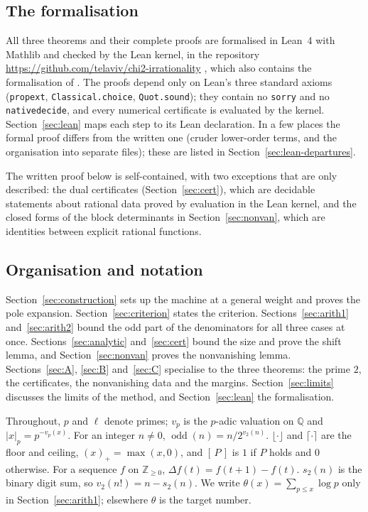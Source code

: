 \documentclass[11pt]{amsart}
\theoremstyle{definition}
\theoremstyle{remark}
\numberwithin{equation}{section}
\newcommand{\ZZ}{\mathbb{Z}}
\newcommand{\QQ}{\mathbb{Q}}
\newcommand{\ind}[1]{[\,#1\,]}
\newcommand{\odd}{\operatorname{odd}}
\newcommand{\lean}[1]{{\def\_{\textunderscore\allowbreak}\texttt{#1}}}
\begin{document}
\subsection{The formalisation}
All three theorems and their complete proofs are formalised in Lean~4 \cite{LeanFour} with Mathlib \cite{Mathlib} and
checked by the Lean kernel, in the repository \url{https://github.com/telaviv/chi2-irrationality} \cite{Chi2Repo},
which also contains the formalisation of \cite{Chi2Paper}. The proofs depend only on Lean's three standard axioms
(\lean{propext}, \lean{Classical.choice}, \lean{Quot.sound}); they contain no \lean{sorry} and no
\lean{native\_decide}, and every numerical certificate is evaluated by the kernel. Section~\ref{sec:lean} maps each
step to its Lean declaration. In a few places the formal proof differs from the written one (cruder lower-order terms,
and the organisation into separate files); these are listed in
Section~\ref{sec:lean-departures}.

The written proof below is self-contained, with two exceptions that are only described: the dual certificates
(Section~\ref{sec:cert}), which are decidable statements about rational data proved by evaluation in the Lean kernel,
and the closed forms of the block determinants in Section~\ref{sec:nonvan}, which are identities between explicit
rational functions.

\subsection{Organisation and notation}
Section~\ref{sec:construction} sets up the machine at a general weight and proves the pole expansion.
Section~\ref{sec:criterion} states the criterion. Sections~\ref{sec:arith1} and~\ref{sec:arith2} bound the odd part of the
denominators for all three cases at once. Sections~\ref{sec:analytic} and~\ref{sec:cert} bound the size and prove the shift
lemma, and Section~\ref{sec:nonvan} proves the nonvanishing lemma. Sections~\ref{sec:A}, \ref{sec:B} and~\ref{sec:C}
specialise to the three theorems: the prime $2$, the certificates, the nonvanishing data and the margins.
Section~\ref{sec:limits} discusses the limits of the method, and Section~\ref{sec:lean} the formalisation.

Throughout, $p$ and $\ell$ denote primes; $v_p$ is the $p$-adic valuation on $\QQ$ and $|x|_p=p^{-v_p(x)}$. For an
integer $n\ne0$, $\odd(n)=n/2^{v_2(n)}$. $\lfloor\cdot\rfloor$ and $\lceil\cdot\rceil$ are the floor and ceiling,
$(x)_+=\max(x,0)$, and $\ind{P}$ is $1$ if $P$ holds and $0$ otherwise. For a sequence $f$ on $\ZZ_{\ge0}$,
$\Delta f(t)=f(t+1)-f(t)$. $s_2(n)$ is the binary digit sum, so $v_2(n!)=n-s_2(n)$. We write $\theta(x)=\sum_{p\le
x}\log p$ only in Section~\ref{sec:arith1}; elsewhere $\theta$ is the target number.
\end{document}
